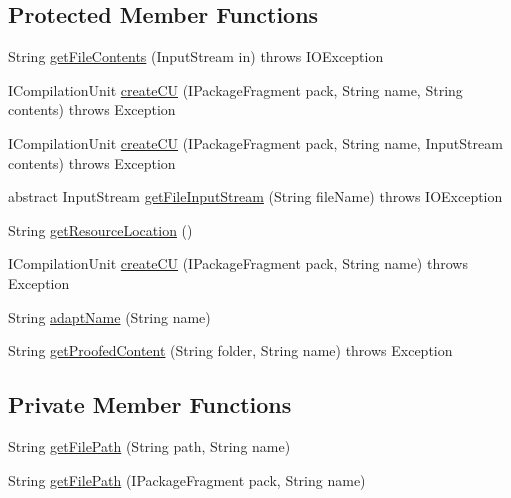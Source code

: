 \subsection*{Protected Member Functions}
\begin{DoxyCompactItemize}
\item 
String \hyperlink{classorg_1_1eclipse_1_1jdt_1_1ui_1_1tests_1_1refactoring_1_1infra_1_1AbstractCUTestCase_a02531a52a351ea73e36a6b2ed9dd9fb6}{getFileContents} (InputStream in)  throws IOException 
\item 
ICompilationUnit \hyperlink{classorg_1_1eclipse_1_1jdt_1_1ui_1_1tests_1_1refactoring_1_1infra_1_1AbstractCUTestCase_a82307dbcd596eca9b08353a26fbd078c}{createCU} (IPackageFragment pack, String name, String contents)  throws Exception 
\item 
ICompilationUnit \hyperlink{classorg_1_1eclipse_1_1jdt_1_1ui_1_1tests_1_1refactoring_1_1infra_1_1AbstractCUTestCase_a7b3fba841cb353c04dfaf9f2577b0bfb}{createCU} (IPackageFragment pack, String name, InputStream contents)  throws Exception 
\item 
abstract InputStream \hyperlink{classorg_1_1eclipse_1_1jdt_1_1ui_1_1tests_1_1refactoring_1_1infra_1_1AbstractCUTestCase_aecf84200ebd3a82e4a8b515d57f5824e}{getFileInputStream} (String fileName)  throws IOException
\item 
String \hyperlink{classorg_1_1eclipse_1_1jdt_1_1ui_1_1tests_1_1refactoring_1_1infra_1_1AbstractCUTestCase_af528a2aad4ad4b54cbb0ed9f4b063175}{getResourceLocation} ()
\item 
ICompilationUnit \hyperlink{classorg_1_1eclipse_1_1jdt_1_1ui_1_1tests_1_1refactoring_1_1infra_1_1AbstractCUTestCase_a7dfc8731b717ee2c845b0c97ec8636db}{createCU} (IPackageFragment pack, String name)  throws Exception 
\item 
String \hyperlink{classorg_1_1eclipse_1_1jdt_1_1ui_1_1tests_1_1refactoring_1_1infra_1_1AbstractCUTestCase_a7481c52242657cf1bdb909a600e106f4}{adaptName} (String name)
\item 
String \hyperlink{classorg_1_1eclipse_1_1jdt_1_1ui_1_1tests_1_1refactoring_1_1infra_1_1AbstractCUTestCase_ae927331591546902a3faff7c20e06bea}{getProofedContent} (String folder, String name)  throws Exception 
\end{DoxyCompactItemize}
\subsection*{Private Member Functions}
\begin{DoxyCompactItemize}
\item 
String \hyperlink{classorg_1_1eclipse_1_1jdt_1_1ui_1_1tests_1_1refactoring_1_1infra_1_1AbstractCUTestCase_a3c9c375796dee3288b215417ddab11b4}{getFilePath} (String path, String name)
\item 
String \hyperlink{classorg_1_1eclipse_1_1jdt_1_1ui_1_1tests_1_1refactoring_1_1infra_1_1AbstractCUTestCase_aa61963a3374a4382a79623c37aa860c8}{getFilePath} (IPackageFragment pack, String name)
\end{DoxyCompactItemize}


